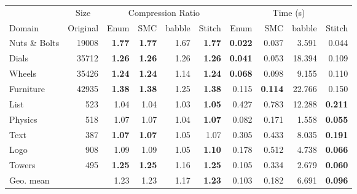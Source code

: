 \begin{tabular}{l r  rrrr rrrr}
\toprule
& \multicolumn{1}{c}{Size} & \multicolumn{4}{c}{Compression Ratio} & \multicolumn{4}{c}{Time (s)} \\
\cmidrule(lr){2-2} \cmidrule(lr){3-6} \cmidrule(lr){7-10}
Domain & Original & Enum & SMC & babble & Stitch & Enum & SMC & babble & Stitch \\
\midrule
Nuts \& Bolts & 19008 & \textbf{1.77} & \textbf{1.77} & 1.67 & \textbf{1.77} & \textbf{0.022} & 0.037 & 3.591 & 0.044 \\
Dials & 35712 & \textbf{1.26} & \textbf{1.26} & 1.26 & \textbf{1.26} & \textbf{0.041} & 0.053 & 18.394 & 0.109 \\
Wheels & 35426 & \textbf{1.24} & \textbf{1.24} & 1.14 & \textbf{1.24} & \textbf{0.068} & 0.098 & 9.155 & 0.110 \\
Furniture & 42935 & \textbf{1.38} & \textbf{1.38} & 1.25 & \textbf{1.38} & 0.115 & \textbf{0.114} & 22.766 & 0.150 \\
List & 523 & 1.04 & 1.04 & 1.03 & \textbf{1.05} & 0.427 & 0.783 & 12.288 & \textbf{0.211} \\
Physics & 518 & 1.07 & 1.07 & 1.04 & \textbf{1.07} & 0.082 & 0.171 & 1.558 & \textbf{0.055} \\
Text & 387 & \textbf{1.07} & \textbf{1.07} & 1.05 & 1.07 & 0.305 & 0.433 & 8.035 & \textbf{0.191} \\
Logo & 908 & 1.09 & 1.09 & 1.05 & \textbf{1.10} & 0.178 & 0.512 & 4.738 & \textbf{0.066} \\
Towers & 495 & \textbf{1.25} & \textbf{1.25} & 1.16 & \textbf{1.25} & 0.105 & 0.334 & 2.679 & \textbf{0.060} \\
\midrule
Geo. mean &  & 1.23 & 1.23 & 1.17 & \textbf{1.23} & 0.103 & 0.182 & 6.691 & \textbf{0.096} \\
\bottomrule
\end{tabular}
